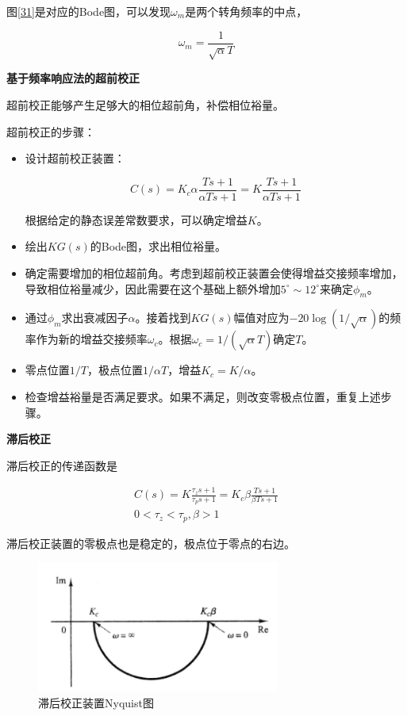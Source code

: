 图\ref{31}是对应的Bode图，可以发现$\omega_m$是两个转角频率的中点，

\begin{equation*}
    \omega_m=\frac{1}{\sqrt\alpha T}
\end{equation*}

\textbf{基于频率响应法的超前校正}

超前校正能够产生足够大的相位超前角，补偿相位裕量。

超前校正的步骤：

\begin{itemize}
    \item 设计超前校正装置：
    
    \begin{equation*}
        C(s)=K_c\alpha\frac{Ts+1}{\alpha Ts+1}=K\frac{Ts+1}{\alpha Ts+1}
    \end{equation*}

    根据给定的静态误差常数要求，可以确定增益$K$。

    \item 绘出$KG(s)$的Bode图，求出相位裕量。
    \item 确定需要增加的相位超前角。考虑到超前校正装置会使得增益交接频率增加，导致相位裕量减少，因此需要在这个基础上额外增加$5^\circ\sim 12^\circ$来确定$\phi_m$。
    \item 通过$\phi_m$求出衰减因子$\alpha$。接着找到$KG(s)$幅值对应为$-20\log(1/\sqrt{\alpha})$的频率作为新的增益交接频率$\omega_c$。根据$\omega_c=1/(\sqrt\alpha T)$确定$T$。
    \item 零点位置$1/T$，极点位置$1/\alpha T$，增益$K_c=K/\alpha$。
    \item 检查增益裕量是否满足要求。如果不满足，则改变零极点位置，重复上述步骤。
\end{itemize}

\textbf{滞后校正}

滞后校正的传递函数是

\begin{gather*}
    C(s)=K\frac{\tau_z s+1}{\tau_p s+1}=K_c\beta\frac{Ts+1}{\beta T s+1}\\ 
    0<\tau_z<\tau_p, \beta>1
\end{gather*}

滞后校正装置的零极点也是稳定的，极点位于零点的右边。

\begin{figure}[!ht]
    \centering
    \includegraphics[width=8cm]{figures/32.png}
    \caption{滞后校正装置Nyquist图}
    \label{32}
\end{figure}

